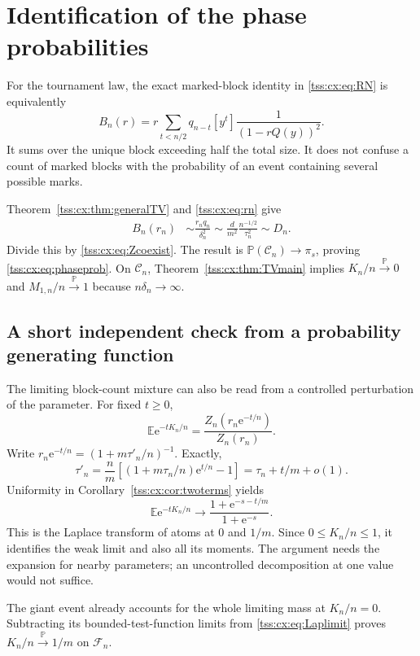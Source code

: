 \documentclass[11pt]{article}
\theoremstyle{remark}\newtheorem{remark}[theorem]{Remark}
\theoremstyle{definition}\newtheorem{definition}[theorem]{Definition}
\newcommand{\e}{\mathrm e}
\newcommand{\E}{\mathbb E}
\newcommand{\Prob}{\mathbb P}
\newcommand{\pto}{\xrightarrow{\Prob}}
\newcommand{\Cev}{\mathcal C_n}
\newcommand{\Fev}{\mathcal F_n}
\begin{document}
\section{Identification of the phase probabilities}
\label{tss:cx:sec:phaseproof}
For the tournament law, the exact marked-block identity in
\eqref{tss:cx:eq:RN} is equivalently
\begin{equation}\label{tss:cx:eq:marked}
 B_n(r)=r\sum_{t<n/2}q_{n-t}
             [y^t]\frac1{(1-rQ(y))^2}.
\end{equation}
It sums over the unique block exceeding half the total size.
It does not confuse a count of marked blocks with the probability
of an event containing several possible marks.

Theorem~\ref{tss:cx:thm:generalTV} and \eqref{tss:cx:eq:rn} give
\begin{align}
 B_n(r_n)&\sim\frac{r_nq_n}{\delta_n^2}
 \sim\frac{d}{m^2}\frac{n^{-1/2}}{\tau_n^2}
 \sim D_n.\label{tss:cx:eq:Bcoexist}
\end{align}
Divide this by \eqref{tss:cx:eq:Zcoexist}. The result is
$\Prob(\Cev)\to\pi_s$, proving \eqref{tss:cx:eq:phaseprob}.
On $\Cev$, Theorem~\ref{tss:cx:thm:TVmain} implies
$K_n/n\pto0$ and $M_{1,n}/n\pto1$ because
$n\delta_n\to\infty$.

\subsection{A short independent check from a probability generating function}
The limiting block-count mixture can also be read from a controlled
perturbation of the parameter. For fixed $t\ge0$,
\begin{equation}\label{tss:cx:eq:LapK}
 \E\e^{-tK_n/n}
 =\frac{Z_n(r_n\e^{-t/n})}{Z_n(r_n)}.
\end{equation}
Write $r_n\e^{-t/n}=(1+m\tau'_n/n)^{-1}$. Exactly,
\[
 \tau'_n=\frac nm\left[(1+m\tau_n/n)\e^{t/n}-1\right]
        =\tau_n+t/m+o(1).
\]
Uniformity in Corollary~\ref{tss:cx:cor:twoterms} yields
\begin{equation}\label{tss:cx:eq:Laplimit}
 \E\e^{-tK_n/n}\longrightarrow
 \frac{1+\e^{-s-t/m}}{1+\e^{-s}}.
\end{equation}
This is the Laplace transform of atoms at $0$ and $1/m$. Since
$0\le K_n/n\le1$, it identifies the weak limit and also all its
moments. The argument needs the expansion for nearby parameters;
an uncontrolled decomposition at one value would not suffice.

The giant event already accounts for the whole limiting mass at
$K_n/n=0$. Subtracting its bounded-test-function limits from
\eqref{tss:cx:eq:Laplimit} proves $K_n/n\pto1/m$ on $\Fev$.
\end{document}
